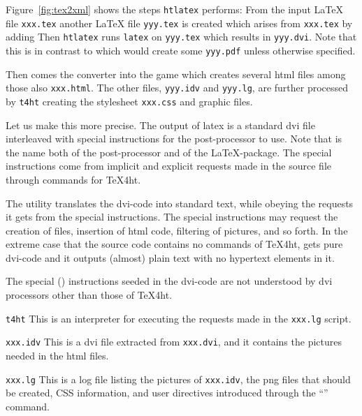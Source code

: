 Figure~\ref{fig:tex2xml} shows the steps \texttt{htlatex} performs: 
From the input \LaTeX{} file \texttt{xxx.tex} 
another \LaTeX{} file \texttt{yyy.tex} is created 
which arises from \texttt{xxx.tex} by adding 
%
Then \texttt{htlatex} runs \texttt{latex} on \texttt{yyy.tex} 
which results in \texttt{yyy.dvi}. 
Note that this is in contrast to \lualatex{} 
which would create some \texttt{yyy.pdf} unless otherwise specified. 

Then comes the converter  into the game 
which creates several html files among those also \texttt{xxx.html}. 
The other files, \texttt{yyy.idv} and \texttt{yyy.lg}, 
are further processed by \texttt{t4ht} 
creating the stylesheet \texttt{xxx.css} and graphic files. 
\medskip


Let us make this more precise. 
The output of latex is a standard \gls{dvi} file 
interleaved with special instructions 
for the post-processor  to use. 
Note that  is the name both of the post-processor 
and of the \LaTeX-package. 
The special instructions come from implicit and explicit requests 
made in the source file through commands for TeX4ht. 

The utility  translates the dvi-code into standard text, 
while obeying the requests it gets from the special instructions. 
The special instructions may request the creation of files, 
insertion of html code, filtering of pictures, and so forth. 
In the extreme case that the source code contains no commands of TeX4ht, 
 gets pure dvi-code and it outputs (almost) plain text 
with no hypertext elements in it.

The special () 
instructions seeded in the dvi-code 
are not understood by dvi processors other than those of TeX4ht.

\texttt{t4ht}
This is an interpreter 
for executing the requests made in the \texttt{xxx.lg} script.

\texttt{xxx.idv}
This is a dvi file extracted from \texttt{xxx.dvi}, 
and it contains the pictures needed in the html files.

\texttt{xxx.lg}
This is a log file listing the pictures of \texttt{xxx.idv}, 
the \gls{png} files that should be created, CSS information, 
and user directives introduced 
through the ``'' command.

